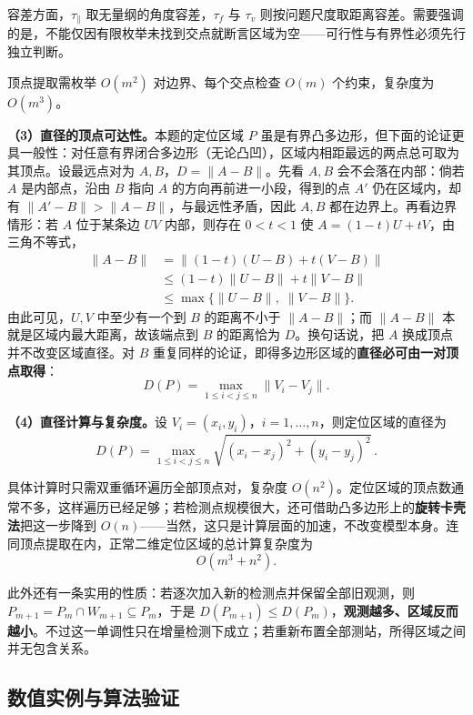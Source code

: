 \documentclass[withoutpreface]{cumcmthesis}
\begin{document}
容差方面，$\tau_{\parallel}$ 取无量纲的角度容差，$\tau_f$ 与 $\tau_v$ 则按问题尺度取距离容差。需要强调的是，不能仅因有限枚举未找到交点就断言区域为空——可行性与有界性必须先行独立判断。

顶点提取需枚举 $O(m^2)$ 对边界、每个交点检查 $O(m)$ 个约束，复杂度为 $O(m^3)$。

\textbf{（3）直径的顶点可达性。}本题的定位区域 $P$ 虽是有界凸多边形，但下面的论证更具一般性：对任意有界闭合多边形（无论凸凹），区域内相距最远的两点总可取为其顶点。设最远点对为 $A,B$，$D=\|A-B\|$。先看 $A,B$ 会不会落在内部：倘若 $A$ 是内部点，沿由 $B$ 指向 $A$ 的方向再前进一小段，得到的点 $A'$ 仍在区域内，却有 $\|A'-B\|>\|A-B\|$，与最远性矛盾，因此 $A,B$ 都在边界上。再看边界情形：若 $A$ 位于某条边 $UV$ 内部，则存在 $0<t<1$ 使 $A=(1-t)U+tV$，由三角不等式，
\begin{align*}
\|A-B\|
& =\left\|(1-t)(U-B)+t(V-B)\right\| \\
&\leq (1-t)\|U-B\|+t\|V-B\|\\
&\leq \max\{\|U-B\|,\;\|V-B\|\}.
\end{align*}
由此可见，$U,V$ 中至少有一个到 $B$ 的距离不小于 $\|A-B\|$；而 $\|A-B\|$ 本就是区域内最大距离，故该端点到 $B$ 的距离恰为 $D$。换句话说，把 $A$ 换成顶点并不改变区域直径。对 $B$ 重复同样的论证，即得多边形区域的\textbf{直径必可由一对顶点取得}：
\[
D(P)=\max_{1\le i<j\le n}\|V_i-V_j\|.
\]

\textbf{（4）直径计算与复杂度。}设 $V_i=(x_i,y_i)$，$i=1,\ldots,n$，则定位区域的直径为
\begin{equation}\label{eq:diameter}
\boxed{
D(P)=\max_{1\leq i<j\leq n}
\sqrt{(x_i-x_j)^2+(y_i-y_j)^2}
}\,.
\end{equation}

具体计算时只需双重循环遍历全部顶点对，复杂度 $O(n^2)$。定位区域的顶点数通常不多，这样遍历已经足够；若检测点规模很大，还可借助凸多边形上的\textbf{旋转卡壳法}把这一步降到 $O(n)$——当然，这只是计算层面的加速，不改变模型本身。连同顶点提取在内，正常二维定位区域的总计算复杂度为
\begin{equation}\label{eq:complexity}
O(m^3+n^2).
\end{equation}

此外还有一条实用的性质：若逐次加入新的检测点并保留全部旧观测，则 $P_{m+1}=P_m\cap W_{m+1}\subseteq P_m$，于是 $D(P_{m+1})\leq D(P_m)$，\textbf{观测越多、区域反而越小}。不过这一单调性只在增量检测下成立；若重新布置全部测站，所得区域之间并无包含关系。

\subsection{数值实例与算法验证}
\end{document}
